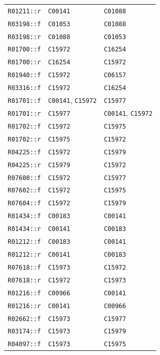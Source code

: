 \documentclass[10pt]{article}
\begin{document}
\begin{longtable}{>{\raggedright\arraybackslash}p{.26\linewidth}>{\raggedright\arraybackslash}p{.30\linewidth}>{\raggedright\arraybackslash}p{.32\linewidth}}
\texttt{R01211::r} & \texttt{C00141} & \texttt{C01088}\\
\texttt{R03198::f} & \texttt{C01053} & \texttt{C01088}\\
\texttt{R03198::r} & \texttt{C01088} & \texttt{C01053}\\
\texttt{R01700::f} & \texttt{C15972} & \texttt{C16254}\\
\texttt{R01700::r} & \texttt{C16254} & \texttt{C15972}\\
\texttt{R01940::f} & \texttt{C15972} & \texttt{C06157}\\
\texttt{R03316::f} & \texttt{C15972} & \texttt{C16254}\\
\texttt{R01701::f} & \texttt{C00141}, \texttt{C15972} & \texttt{C15977}\\
\texttt{R01701::r} & \texttt{C15977} & \texttt{C00141}, \texttt{C15972}\\
\texttt{R01702::f} & \texttt{C15972} & \texttt{C15975}\\
\texttt{R01702::r} & \texttt{C15975} & \texttt{C15972}\\
\texttt{R04225::f} & \texttt{C15972} & \texttt{C15979}\\
\texttt{R04225::r} & \texttt{C15979} & \texttt{C15972}\\
\texttt{R07600::f} & \texttt{C15972} & \texttt{C15977}\\
\texttt{R07602::f} & \texttt{C15972} & \texttt{C15975}\\
\texttt{R07604::f} & \texttt{C15972} & \texttt{C15979}\\
\texttt{R01434::f} & \texttt{C00183} & \texttt{C00141}\\
\texttt{R01434::r} & \texttt{C00141} & \texttt{C00183}\\
\texttt{R01212::f} & \texttt{C00183} & \texttt{C00141}\\
\texttt{R01212::r} & \texttt{C00141} & \texttt{C00183}\\
\texttt{R07618::f} & \texttt{C15973} & \texttt{C15972}\\
\texttt{R07618::r} & \texttt{C15972} & \texttt{C15973}\\
\texttt{R01216::f} & \texttt{C00966} & \texttt{C00141}\\
\texttt{R01216::r} & \texttt{C00141} & \texttt{C00966}\\
\texttt{R02662::f} & \texttt{C15973} & \texttt{C15977}\\
\texttt{R03174::f} & \texttt{C15973} & \texttt{C15979}\\
\texttt{R04097::f} & \texttt{C15973} & \texttt{C15975}\\

\end{longtable}
\end{document}
